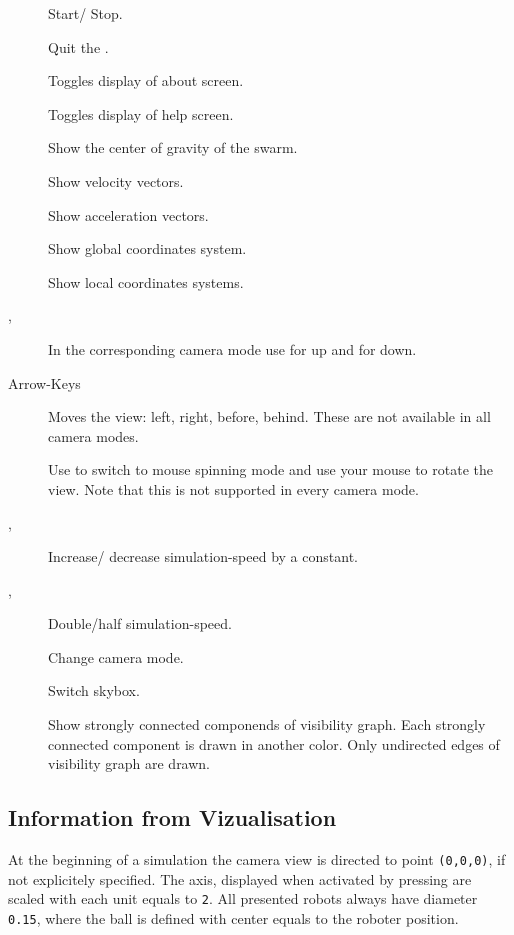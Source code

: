 \begin{description}
	\item [] Start/ Stop.
	\item [] Quit the \RSS.
	\item [] Toggles display of about screen.
	\item [] Toggles display of help screen.
	\item [] Show the center of gravity of the swarm.
	\item [] Show velocity vectors.
	\item [] Show acceleration vectors.
	\item [] Show global coordinates system.
	\item [] Show local coordinates systems.
	\item [,] In the corresponding camera mode use  for up  and  for down.
	\item [Arrow-Keys] Moves the view: left, right, before, behind. These are not available in all camera modes.
	\item [] Use to switch to mouse spinning mode and use your mouse to rotate the view. Note that this is not supported in every camera mode.
	\item [\fbox{\tt +}, \fbox{\tt -}] Increase/ decrease simulation-speed by a constant.
	\item [\fbox{\tt *},\fbox{\tt /}] Double/half simulation-speed.
	\item [] Change camera mode.
	\item [] Switch skybox.
	\item [] Show strongly connected componends of visibility graph. Each strongly connected component is drawn in another color. Only undirected edges of visibility graph are drawn.
\end{description}

\subsection{Information from Vizualisation}
At the beginning of a simulation the camera view is directed to point \texttt{(0,0,0)}, if not explicitely specified. The axis, displayed when activated by pressing  are scaled with each unit equals to \texttt{2}. All presented robots always have diameter \texttt{0.15}, where the ball is defined with center equals to the roboter position.

